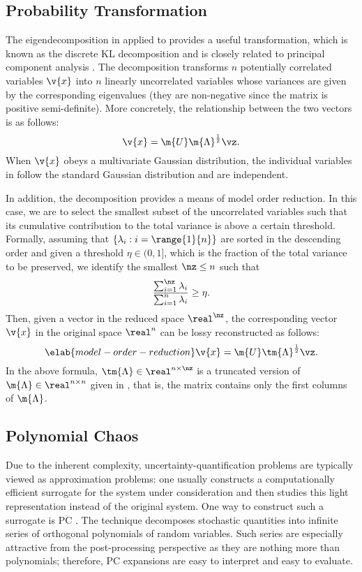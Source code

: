 \subsection{Probability Transformation}

The eigendecomposition in  applied to
 provides a useful transformation, which is known as the
discrete \ac{KL} decomposition \cite{ghanem1991, xiu2010} and is closely related
to principal component analysis \cite{hastie2013}. The decomposition transforms
$n$ potentially correlated variables $\v{x}$ into $n$ linearly uncorrelated
variables \vz whose variances are given by the corresponding eigenvalues (they
are non-negative since the matrix is positive semi-definite). More concretely,
the relationship between the two vectors is as follows:
\[
  \v{x} = \m{U} \m{\Lambda}^\frac{1}{2} \vz.
\]
When $\v{x}$ obeys a multivariate Gaussian distribution, the individual
variables in \vz follow the standard Gaussian distribution and are independent.

In addition, the decomposition provides a means of model order reduction. In
this case, we are to select the smallest subset of the uncorrelated variables
such that its cumulative contribution to the total variance is above a certain
threshold. Formally, assuming that $\{ \lambda_i: i = \range{1}{n} \}$ are
sorted in the descending order and given a threshold $\eta \in (0, 1]$, which is
the fraction of the total variance to be preserved, we identify the smallest
$\nz \leq n$ such that
\[
  \frac{\sum_{i = 1}^\nz \lambda_i}{\sum_{i = 1}^n \lambda_i} \geq \eta.
\]
Then, given a vector \vz in the reduced space $\real^\nz$, the corresponding
vector $\v{x}$ in the original space $\real^n$ can be lossy reconstructed as
follows:
\begin{equation} \elab{model-order-reduction}
  \v{x} = \m{U} \tm{\Lambda}^\frac{1}{2} \vz.
\end{equation}
In the above formula, $\tm{\Lambda} \in \real^{n \times \nz}$ is a truncated
version of $\m{\Lambda} \in \real^{n \times n}$ given in
, that is, the matrix contains only the first \nz
columns of $\m{\Lambda}$.

\subsection{Polynomial Chaos}

Due to the inherent complexity, uncertainty-quantification problems are
typically viewed as approximation problems: one usually constructs a
computationally efficient surrogate for the system under consideration and then
studies this light representation instead of the original system. One way to
construct such a surrogate is \ac{PC} \cite{xiu2010}. The technique decomposes
stochastic quantities into infinite series of orthogonal polynomials of random
variables. Such series are especially attractive from the post-processing
perspective as they are nothing more than polynomials; therefore, \ac{PC}
expansions are easy to interpret and easy to evaluate.

